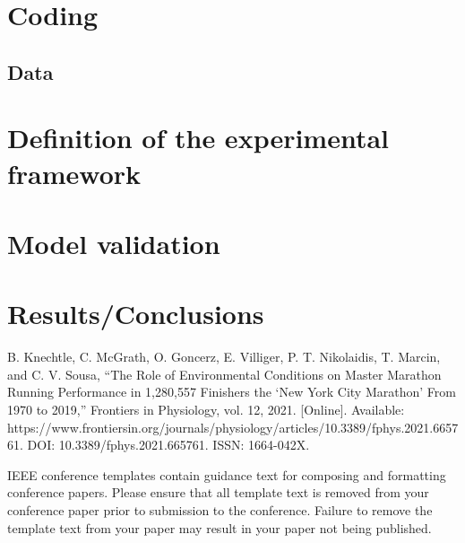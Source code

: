 \documentclass[conference]{IEEEtran}
\begin{document}
\section{Coding}
\subsection{Data}
\section{Definition of the experimental framework}
\section{Model validation}
\section{Results/Conclusions}

\begin{thebibliography}{00}
 B. Knechtle, C. McGrath, O. Goncerz, E. Villiger, P. T. Nikolaidis, T. Marcin, and C. V. Sousa, ``The Role of Environmental Conditions on Master Marathon Running Performance in 1,280,557 Finishers the ‘New York City Marathon’ From 1970 to 2019,'' Frontiers in Physiology, vol. 12, 2021. [Online]. Available: https://www.frontiersin.org/journals/physiology/articles/10.3389/fphys.2021.665761. DOI: 10.3389/fphys.2021.665761. ISSN: 1664-042X.


\end{thebibliography}
\vspace{12pt}
\color{red}
IEEE conference templates contain guidance text for composing and formatting conference papers. Please ensure that all template text is removed from your conference paper prior to submission to the conference. Failure to remove the template text from your paper may result in your paper not being published.
\end{document}
